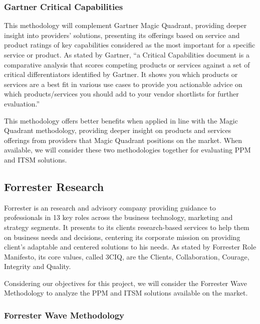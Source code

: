 \subsubsection{Gartner Critical Capabilities}

This methodology will complement Gartner Magic Quadrant, providing deeper insight into providers' solutions, presenting its offerings based on service and product ratings of key capabilities considered as the most important for a specific service or product. As stated by Gartner, ``a Critical Capabilities document is a comparative analysis that scores competing products or services against a set of critical differentiators identified by Gartner. It shows you which products or services are a best fit in various use cases to provide you actionable advice on which products/services you should add to your vendor shortlists for further evaluation.''\par
This methodology offers better benefits when applied in line with the Magic Quadrant methodology, providing deeper insight on products and services offerings from providers that Magic Quadrant positions on the market. When available, we will consider these two methodologies together for evaluating PPM and ITSM solutions.\par

\subsection{Forrester Research} 

Forrester is an research and advisory company providing guidance to professionals in 13 key roles across the business technology, marketing and strategy segments. It presents to its clients research-based services to help them on business needs and decisions, centering its corporate mission on providing client's adaptable and centered solutions to his needs. As stated by Forrester Role Manifesto, its core values, called 3CIQ, are the Clients, Collaboration, Courage, Integrity and Quality.\par
Considering our objectives for this project, we will consider the Forrester Wave Methodology to analyze the PPM and ITSM solutions available on the market.

\subsubsection{Forrester Wave Methodology}

